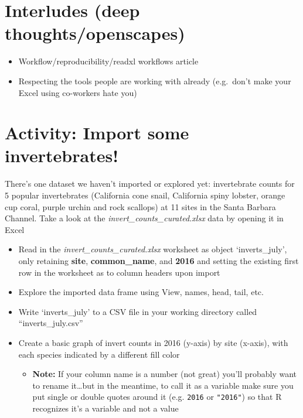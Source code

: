 \documentclass[]{book}
\providecommand{\tightlist}{%
  \setlength{\itemsep}{0pt}\setlength{\parskip}{0pt}}
\begin{document}
\hypertarget{interludes-deep-thoughtsopenscapes}{%
\section{Interludes (deep thoughts/openscapes)}\label{interludes-deep-thoughtsopenscapes}}

\begin{itemize}
\tightlist
\item
  Workflow/reproducibility/readxl workflows article
\item
  Respecting the tools people are working with already (e.g.~don't make your Excel using co-workers hate you)
\end{itemize}

\hypertarget{activity-import-some-invertebrates}{%
\section{Activity: Import some invertebrates!}\label{activity-import-some-invertebrates}}

There's one dataset we haven't imported or explored yet: invertebrate counts for 5 popular invertebrates (California cone snail, California spiny lobster, orange cup coral, purple urchin and rock scallops) at 11 sites in the Santa Barbara Channel. Take a look at the \emph{invert\_counts\_curated.xlsx} data by opening it in Excel

\begin{itemize}
\tightlist
\item
  Read in the \emph{invert\_counts\_curated.xlsx} worksheet as object `inverts\_july', only retaining \textbf{site}, \textbf{common\_name}, and \textbf{2016} and setting the existing first row in the worksheet as to column headers upon import
\item
  Explore the imported data frame using View, names, head, tail, etc.
\item
  Write `inverts\_july' to a CSV file in your working directory called ``inverts\_july.csv''
\item
  Create a basic graph of invert counts in 2016 (y-axis) by site (x-axis), with each species indicated by a different fill color

  \begin{itemize}
  \tightlist
  \item
    \textbf{Note:} If your column name is a number (not great) you'll probably want to rename it\ldots{}but in the meantime, to call it as a variable make sure you put single or double quotes around it (e.g. \texttt{\textquotesingle{}2016\textquotesingle{}} or \texttt{"2016"}) so that R recognizes it's a variable and not a value
  \end{itemize}
\end{itemize}
\end{document}
